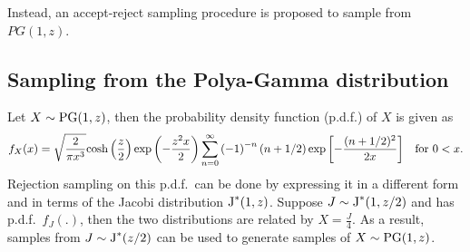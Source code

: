 \documentclass[a4paper]{article}\usepackage[]{graphicx}\usepackage[]{color}
\begin{document}
Instead, an accept-reject sampling procedure is proposed to sample from $PG(1,z)$.

\subsection{Sampling from the Polya-Gamma distribution}
Let $X\sim\textup{PG}(1,z)$, then the probability density function (p.d.f.) of $X$ is given as
\begin{equation}
f_X(x)=\sqrt{\frac{2}{\pi x^3}}\textup{cosh}\left(\dfrac{z}{2}\right)\exp{\left(-\frac{z^2x}{2}\right)}\sum_{n=0}^{\infty}\left(-1\right)^{-n}\left(n+1/2\right)\exp{\left[-\frac{(n+1/2)^2}{2x}\right]} \quad \textup{for }0<x.
\end{equation}
Rejection sampling on this p.d.f.~can be done by expressing it in a different form and in terms of the Jacobi distribution $\textup{J}^{*}(1,z)$. Suppose $J\sim \textup{J}^{*}(1,z/2)$ and has p.d.f.~$f_J(.)$, then the two distributions are related by $X=\frac{J}{4}$. As a result, samples from $J\sim\textup{J}^*(z/2)$ can be used to generate samples of $X\sim\textup{PG}(1,z)$.
\end{document}
